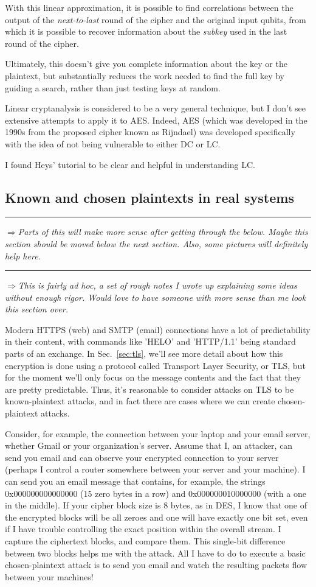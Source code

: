 \documentclass[%
 aip,
 jmp,%
 amsmath,amssymb,
 reprint,%
]{revtex4-1}
\def\outlinecomment#1{\hrule{\color{Blue}$\Rightarrow${\small\em #1}}\hrule}
\def\comment#1{{\color{ForestGreen}$\Rightarrow${\small\em #1}}}
\begin{document}
With this linear approximation, it is possible to find correlations
between the output of the \emph{next-to-last} round of the cipher and the
original input qubits, from which it is possible to recover
information about the \emph{subkey} used in the last round of the cipher.

Ultimately, this doesn't give you complete information about the key
or the plaintext, but substantially reduces the work needed to find
the full key by guiding a search, rather than just testing keys at
random.

Linear cryptanalysis is considered to be a very general technique, but
I don't see extensive attempts to apply it to AES.  Indeed, AES (which
was developed in the 1990s from the proposed cipher known as Rijndael)
was developed specifically with the idea of not being vulnerable to
either DC or LC.

I found Heys' tutorial to be clear and helpful in understanding LC.

\subsection{Known and chosen plaintexts in real systems}

\outlinecomment{Parts of this will make more sense after getting
  through the below.  Maybe this section should be moved below the
  next section.  Also, some pictures will definitely help here.}

\comment{This is fairly ad hoc, a set of rough notes I wrote up
  explaining some ideas without enough rigor.  Would love to have
  someone with more sense than me look this section over.}

Modern HTTPS (web) and SMTP (email) connections have a lot of
predictability in their content, with commands like 'HELO' and
'HTTP/1.1' being standard parts of an exchange.  In
Sec.~\ref{sec:tls}, we'll see more detail about how this encryption is
done using a protocol called Transport Layer Security, or TLS, but for
the moment we'll only focus on the message contents and the fact that
they are pretty predictable.  Thus, it's reasonable to consider
attacks on TLS to be known-plaintext attacks, and in fact there are
cases where we can create chosen-plaintext attacks.

Consider, for example, the connection between your laptop and your
email server, whether Gmail or your organization's server.  Assume
that I, an attacker, can send you email and can observe your encrypted
connection to your server (perhaps I control a router somewhere
between your server and your machine).  I can send you an email
message that contains, for example, the strings 0x000000000000000 (15
zero bytes in a row) and 0x000000010000000 (with a one in the middle).
If your cipher block size is 8 bytes, as in DES, I know that one of
the encrypted blocks will be all zeroes and one will have exactly one
bit set, even if I have trouble controlling the exact position within
the overall stream.  I capture the ciphertext blocks, and compare
them.  This single-bit difference between two blocks helps me with the
attack.  All I have to do to execute a basic chosen-plaintext attack
is to send you email and watch the resulting packets flow between your
machines!
\end{document}
